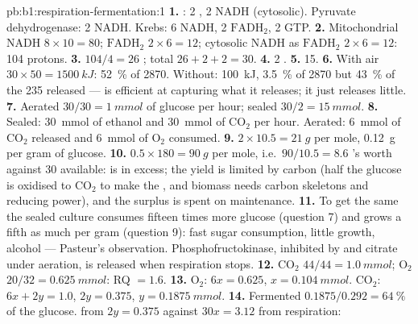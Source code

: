 \begin{solution}{pb:b1:respiration-fermentation:1}
\textbf{1.} : 2 , 2 NADH (cytosolic). Pyruvate
dehydrogenase: 2 NADH. Krebs: 6 NADH, 2 $\mathrm{FADH_2}$, 2 GTP.
\textbf{2.} Mitochondrial NADH $8\times 10 = 80$; $\mathrm{FADH_2}$
$2\times 6 = 12$; cytosolic NADH as $\mathrm{FADH_2}$ $2\times 6 = 12$:
104 protons.
\textbf{3.} $104/4 = 26$ ; total $26 + 2 + 2 = 30$.
\textbf{4.} 2 .
\textbf{5.} 15.
\textbf{6.} With air $30\times 50 = \qty{1500}{kJ}$: \qty{52}{\%} of
2870. Without: \qty{100}{kJ}, \qty{3.5}{\%} of 2870 but \qty{43}{\%} of
the 235 released ---  is efficient at capturing what it
releases; it just releases little.
\textbf{7.} Aerated $30/30 = \qty{1}{mmol}$ of glucose per hour; sealed
$30/2 = \qty{15}{mmol}$.
\textbf{8.} Sealed: \qty{30}{mmol} of ethanol and \qty{30}{mmol} of
$\mathrm{CO_2}$ per hour. Aerated: \qty{6}{mmol} of $\mathrm{CO_2}$
released and \qty{6}{mmol} of $\mathrm{O_2}$ consumed.
\textbf{9.} $2\times 10.5 = \qty{21}{g}$ per mole, \qty{0.12}{g} per
gram of glucose.
\textbf{10.} $0.5\times 180 = \qty{90}{g}$ per mole, i.e.\ $90/10.5 =
8.6$ 's worth against 30 available:  is in excess; the yield is
limited by carbon (half the glucose is oxidised to $\mathrm{CO_2}$ to
make the , and biomass needs carbon skeletons and reducing power),
and the surplus  is spent on maintenance.
\textbf{11.} To get the same  the sealed culture consumes fifteen
times more glucose (question 7) and grows a fifth as much per gram
(question 9): fast sugar consumption, little growth, alcohol ---
Pasteur's observation. Phosphofructokinase, inhibited by  and
citrate under aeration, is released when respiration stops.
\textbf{12.} $\mathrm{CO_2}$ $44/44 = \qty{1.0}{mmol}$; $\mathrm{O_2}$
$20/32 = \qty{0.625}{mmol}$: RQ $= 1.6$.
\textbf{13.} $\mathrm{O_2}$: $6x = 0.625$, $x = \qty{0.104}{mmol}$.
$\mathrm{CO_2}$: $6x + 2y = 1.0$, $2y = 0.375$, $y = \qty{0.1875}{mmol}$.
\textbf{14.} Fermented $0.1875/0.292 = \qty{64}{\%}$ of the glucose. 
from  $2y = 0.375$ against $30x = 3.12$ from respiration:

\end{solution}
